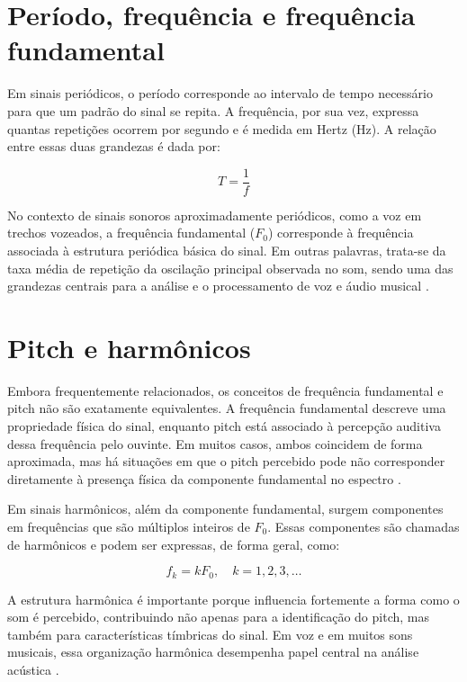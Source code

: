 \section{Período, frequência e frequência fundamental}

Em sinais periódicos, o período corresponde ao intervalo de tempo necessário para que um padrão do sinal se repita. A frequência, por sua vez, expressa quantas repetições ocorrem por segundo e é medida em Hertz (Hz). A relação entre essas duas grandezas é dada por:

\begin{equation}
T = \frac{1}{f}
\end{equation}

No contexto de sinais sonoros aproximadamente periódicos, como a voz em trechos vozeados, a frequência fundamental (\(F_0\)) corresponde à frequência associada à estrutura periódica básica do sinal. Em outras palavras, trata-se da taxa média de repetição da oscilação principal observada no som, sendo uma das grandezas centrais para a análise e o processamento de voz e áudio musical \cite{aalto_f0}.

\section{Pitch e harmônicos}

Embora frequentemente relacionados, os conceitos de frequência fundamental e pitch não são exatamente equivalentes. A frequência fundamental descreve uma propriedade física do sinal, enquanto pitch está associado à percepção auditiva dessa frequência pelo ouvinte. Em muitos casos, ambos coincidem de forma aproximada, mas há situações em que o pitch percebido pode não corresponder diretamente à presença física da componente fundamental no espectro \cite{aalto_f0,aalto_speech_properties}.

Em sinais harmônicos, além da componente fundamental, surgem componentes em frequências que são múltiplos inteiros de \(F_0\). Essas componentes são chamadas de harmônicos e podem ser expressas, de forma geral, como:

\begin{equation}
f_k = kF_0, \quad k = 1,2,3,\ldots
\end{equation}

A estrutura harmônica é importante porque influencia fortemente a forma como o som é percebido, contribuindo não apenas para a identificação do pitch, mas também para características tímbricas do sinal. Em voz e em muitos sons musicais, essa organização harmônica desempenha papel central na análise acústica \cite{aalto_speech_properties}.

